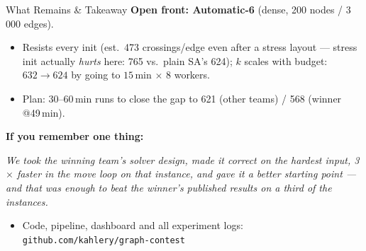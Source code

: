 \begin{frame}{What Remains \& Takeaway}
  \textbf{Open front: Automatic-6} (dense, 200 nodes / 3\,000 edges).
  \begin{itemize}
    \item Resists every init (est.\ 473 crossings/edge even after a stress layout ---
          stress init actually \emph{hurts} here: 765 vs.\ plain SA's 624);
          $k$ scales with budget: $632 \to 624$ by going to $15$\,min $\times$ 8 workers.
    \item Plan: 30--60\,min runs to close the gap to 621 (other teams) / 568 (winner @49\,min).
  \end{itemize}
  \medskip
  \textbf{If you remember one thing:}
  \begin{center}
    \emph{We took the winning team's solver design, made it correct on the hardest input,
    3$\times$ faster in the move loop on that instance, and gave it a better starting
    point ---\\
    and that was enough to beat the winner's published results on a third of the instances.}
  \end{center}
  \medskip
  \begin{itemize}
    \item Code, pipeline, dashboard and all experiment logs:
          \texttt{github.com/kahlery/graph-contest}
  \end{itemize}
\end{frame}
